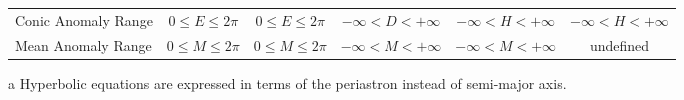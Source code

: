 \documentclass[a4paper,fleqn,usenatbib]{mnras}
\begin{document}
\begin{table}
\begin{threeparttable}
\begin{tabular}{l c c c c c}
 Conic Anomaly Range & $0\leq E \leq 2\pi$ & $0\leq E \leq 2\pi$ & $-\infty < D < +\infty$ & $-\infty< H < +\infty$ & $-\infty< H < +\infty$ \\
 Mean Anomaly Range & $0\leq M \leq 2\pi$ & $0\leq M \leq 2\pi$ & $-\infty< M < +\infty$ & $-\infty < M < +\infty$ & undefined \\
 \hline
 \hline
\end{tabular}
\label{tab:summary}
	\begin{tablenotes}
	\small
\item[a]{Hyperbolic equations are expressed in terms of the periastron instead of semi-major axis.}
	\end{tablenotes}
\end{threeparttable}
\end{table}



\bsp	%
\label{lastpage}
\end{document}
